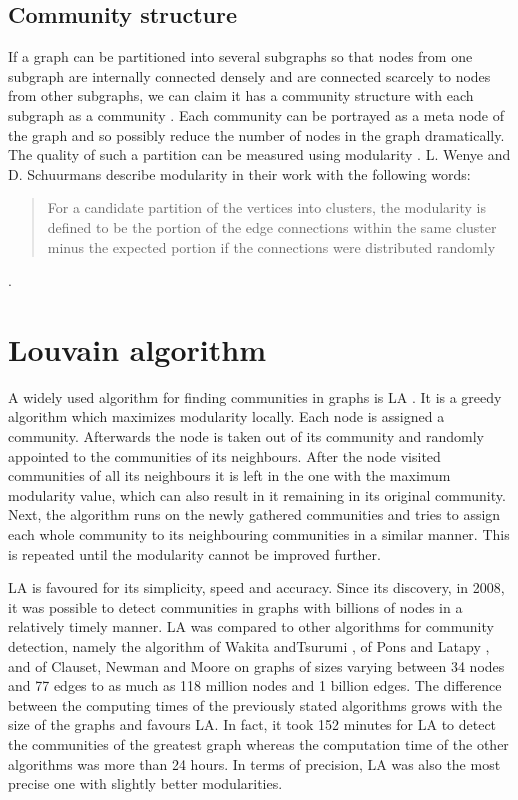 \subsection{Community structure}
If a graph can be partitioned into several subgraphs so that nodes from one subgraph are internally connected densely and are connected scarcely to nodes from other subgraphs, we can claim it has a  community structure with each subgraph as a community \cite{communitiesOverview}. Each community can be portrayed as a meta node of the graph and so possibly reduce the number of nodes in the graph dramatically. The quality of such a partition can be measured using modularity \cite{modularityOverview}. L. Wenye and D. Schuurmans describe modularity in their work with the following words: \begin{quotation}  For a candidate partition of the vertices into clusters, the modularity is defined to be the portion of the edge connections within the same cluster minus the expected portion if the connections were distributed randomly \cite{modularityDefinition} \end{quotation}.

\section{Louvain algorithm} \label{louvainAlgorithm}
A widely used algorithm for finding communities in graphs is LA \cite{louvainAlgorithm}. It is a greedy algorithm which maximizes modularity locally. Each node is assigned a community. Afterwards the node is taken out of its community and randomly appointed to the communities of its neighbours. After the node visited communities of all its neighbours it is left in the one with the maximum modularity value, which can also result in it remaining in its original community. Next, the algorithm runs on the newly gathered communities and tries to assign each whole community to its neighbouring communities in a similar manner. This is repeated until the modularity cannot be improved further.

LA is favoured for its simplicity, speed and accuracy. Since its discovery, in 2008, it was possible to detect communities in graphs with billions of nodes in a relatively timely manner. LA was compared to other algorithms for community detection, namely the algorithm of Wakita andTsurumi \cite{wakitaAndToshiyuki}, of Pons and Latapy \cite{ponsAndLatapy}, and of Clauset, Newman and Moore \cite{CNM} on graphs of sizes varying between 34 nodes and 77 edges to as much as 118 million nodes and 1 billion edges. The difference between the computing times of the previously stated algorithms grows with the size of the graphs and favours LA. In fact, it took 152 minutes for LA to detect the communities of the greatest graph whereas the computation time of the other algorithms was more than 24 hours. In terms of precision, LA was also the most precise one with slightly better modularities.

